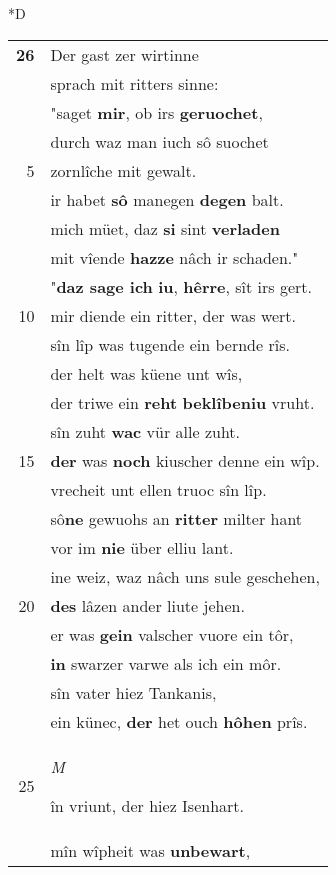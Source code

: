 \documentclass[8pt,a4paper,notitlepage]{article}
\begin{document}
\begin{table}[ht]
\begin{minipage}[t]{0.5\linewidth}
\small
\begin{center}*D
\end{center}
\begin{tabular}{rl}
\textbf{26} & Der gast zer wirtinne\\ 
 & sprach mit ritters sinne:\\ 
 & "saget \textbf{mir}, ob irs \textbf{geruochet},\\ 
 & durch waz man iuch sô suochet\\ 
5 & zornlîche mit gewalt.\\ 
 & ir habet \textbf{sô} manegen \textbf{degen} balt.\\ 
 & mich müet, daz \textbf{si} sint \textbf{verladen}\\ 
 & mit vîende \textbf{hazze} nâch ir schaden."\\ 
 & "\textbf{daz sage ich} \textbf{iu}, \textbf{hêrre}, sît irs gert.\\ 
10 & mir diende ein ritter, der was wert.\\ 
 & sîn lîp was tugende ein bernde rîs.\\ 
 & der helt was küene unt wîs,\\ 
 & der triwe ein \textbf{reht} \textbf{beklîbeniu} vruht.\\ 
 & sîn zuht \textbf{wac} vür alle zuht.\\ 
15 & \textbf{der} was \textbf{noch} kiuscher denne ein wîp.\\ 
 & vrecheit unt ellen truoc sîn lîp.\\ 
 & sô\textbf{ne} gewuohs an \textbf{ritter} milter hant\\ 
 & vor im \textbf{nie} über elliu lant.\\ 
 & ine weiz, waz nâch uns sule geschehen,\\ 
20 & \textbf{des} lâzen ander liute jehen.\\ 
 & er was \textbf{gein} valscher vuore ein tôr,\\ 
 & \textbf{in} swarzer varwe als ich ein môr.\\ 
 & sîn vater hiez Tankanis,\\ 
 & ein künec, \textbf{der} het ouch \textbf{hôhen} prîs.\\ 
25 & \begin{large}\textit{M}\end{large}în vriunt, der hiez Isenhart.\\ 
 & mîn wîpheit was \textbf{unbewart},\\ 

\end{tabular}
\end{minipage}
\end{table}
\end{document}
